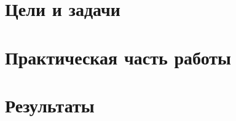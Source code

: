 \documentclass[a4paper, 14pt, report]{ncc}
\begin{document}
\def\chaptername{Часть}
\def\contentsname{Содержание}



\tableofcontents
\clearpage	


\chapter[Цели и задачи]{Цели и задачи}


\chapter[Практическая часть работы]{Практическая часть работы}






\chapter[Результаты]{Результаты}

\end{document}
